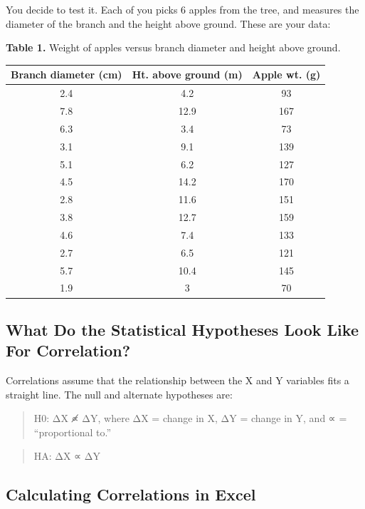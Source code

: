 \documentclass[
]{book}
\begin{document}
You decide to test it. Each of you picks 6 apples from the tree, and measures the diameter of the branch and the height above ground. These are your data:

\textbf{Table 1.} Weight of apples versus branch diameter and height above ground.

\begin{longtable}[]{@{}ccc@{}}
\toprule
Branch diameter (cm) & Ht. above ground (m) & Apple wt. (g) \\
\midrule
\endhead
2.4 & 4.2 & 93 \\
7.8 & 12.9 & 167 \\
6.3 & 3.4 & 73 \\
3.1 & 9.1 & 139 \\
5.1 & 6.2 & 127 \\
4.5 & 14.2 & 170 \\
2.8 & 11.6 & 151 \\
3.8 & 12.7 & 159 \\
4.6 & 7.4 & 133 \\
2.7 & 6.5 & 121 \\
5.7 & 10.4 & 145 \\
1.9 & 3 & 70 \\
\bottomrule
\end{longtable}

\hypertarget{what-do-the-statistical-hypotheses-look-like-for-correlation}{%
\subsection{What Do the Statistical Hypotheses Look Like For Correlation?}\label{what-do-the-statistical-hypotheses-look-like-for-correlation}}

Correlations assume that the relationship between the X and Y variables fits a straight line. The null and alternate hypotheses are:

\begin{quote}
H0: ΔX ∝̸ ΔY, where ΔX = change in X, ΔY = change in Y, and ∝ = ``proportional to.''
\end{quote}

\begin{quote}
HA: ΔX ∝ ΔY
\end{quote}

\hypertarget{calculating-correlations-in-excel}{%
\subsection{Calculating Correlations in Excel}\label{calculating-correlations-in-excel}}
\end{document}
